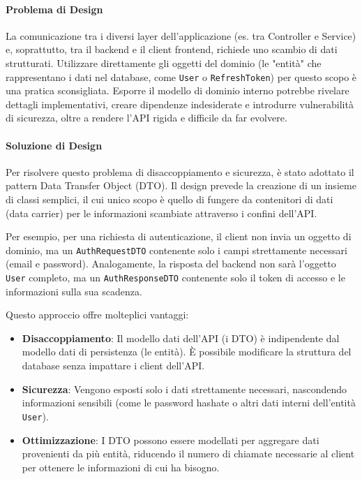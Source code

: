 \documentclass[12pt,a4paper,openright,twoside]{book}
\begin{document}
\paragraph{Problema di Design}
La comunicazione tra i diversi layer dell'applicazione (es. tra Controller e Service) e, soprattutto, tra il backend e il client frontend, richiede uno scambio di dati strutturati. Utilizzare direttamente gli oggetti del dominio (le "entità" che rappresentano i dati nel database, come \texttt{User} o \texttt{RefreshToken}) per questo scopo è una pratica sconsigliata. Esporre il modello di dominio interno potrebbe rivelare dettagli implementativi, creare dipendenze indesiderate e introdurre vulnerabilità di sicurezza, oltre a rendere l'API rigida e difficile da far evolvere.

\paragraph{Soluzione di Design}
Per risolvere questo problema di disaccoppiamento e sicurezza, è stato adottato il pattern Data Transfer Object (DTO). Il design prevede la creazione di un insieme di classi semplici, il cui unico scopo è quello di fungere da contenitori di dati (data carrier) per le informazioni scambiate attraverso i confini dell'API.

Per esempio, per una richiesta di autenticazione, il client non invia un oggetto di dominio, ma un \texttt{AuthRequestDTO} contenente solo i campi strettamente necessari (email e password). Analogamente, la risposta del backend non sarà l'oggetto \texttt{User} completo, ma un \texttt{AuthResponseDTO} contenente solo il token di accesso e le informazioni sulla sua scadenza.

Questo approccio offre molteplici vantaggi:
\begin{itemize}
    \item \textbf{Disaccoppiamento}: Il modello dati dell'API (i DTO) è indipendente dal modello dati di persistenza (le entità). È possibile modificare la struttura del database senza impattare i client dell'API.
    \item \textbf{Sicurezza}: Vengono esposti solo i dati strettamente necessari, nascondendo informazioni sensibili (come le password hashate o altri dati interni dell'entità \texttt{User}).
    \item \textbf{Ottimizzazione}: I DTO possono essere modellati per aggregare dati provenienti da più entità, riducendo il numero di chiamate necessarie al client per ottenere le informazioni di cui ha bisogno.
\end{itemize}
\end{document}
